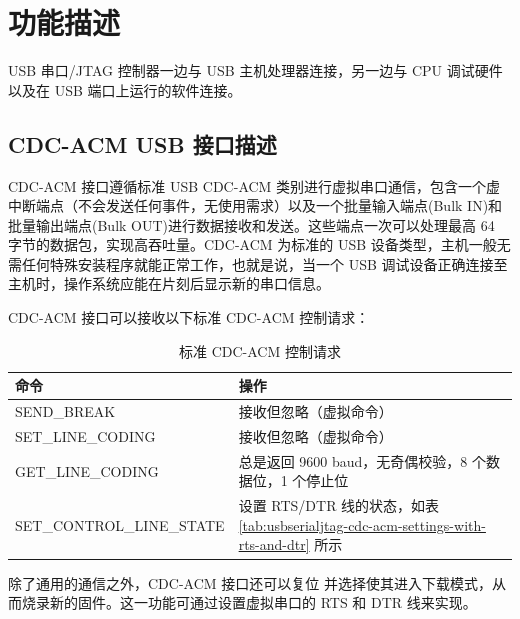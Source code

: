 \documentclass[main\_\_CN.tex]{subfiles}
\begin{document}
\section{功能描述}
\label{sec:usbserialjtag-func-descr}

USB 串口/JTAG 控制器一边与 USB 主机处理器连接，另一边与 CPU 调试硬件以及在 USB 端口上运行的软件连接。

\subsection{CDC-ACM USB 接口描述}

CDC-ACM 接口遵循标准 USB CDC-ACM 类别进行虚拟串口通信，包含一个虚中断端点（不会发送任何事件，无使用需求）以及一个批量输入端点(Bulk IN)和批量输出端点(Bulk OUT)进行数据接收和发送。这些端点一次可以处理最高 64 字节的数据包，实现高吞吐量。CDC-ACM 为标准的 USB 设备类型，主机一般无需任何特殊安装程序就能正常工作，也就是说，当一个 USB 调试设备正确连接至主机时，操作系统应能在片刻后显示新的串口信息。

CDC-ACM 接口可以接收以下标准 CDC-ACM 控制请求：

\begin{table}[H]
    \centering
    \caption{标准 CDC-ACM 控制请求}
    \label{tab:usbserialjtag-standard-cdc-acm-requests}

    \begin{tabular}{ | l | l | }
    \hline
        \rowcolor{lightgray}
        \textbf{命令} & \textbf{操作} \\\hline

        SEND\_BREAK & 接收但忽略（虚拟命令）\\\hline
        SET\_LINE\_CODING & 接收但忽略（虚拟命令） \\\hline
        GET\_LINE\_CODING & 总是返回 9600 baud，无奇偶校验，8 个数据位，1 个停止位 \\\hline
        SET\_CONTROL\_LINE\_STATE & 设置 RTS/DTR 线的状态，如表 \ref{tab:usbserialjtag-cdc-acm-settings-with-rts-and-dtr} 所示 \\\hline
    \end{tabular}
\end{table}

除了通用的通信之外，CDC-ACM 接口还可以复位 \chipname{} 并选择使其进入下载模式，从而烧录新的固件。这一功能可通过设置虚拟串口的 RTS 和 DTR 线来实现。
\end{document}
